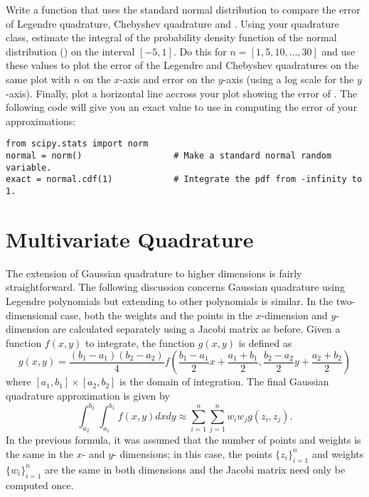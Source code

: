 \begin{problem} %
Write a function that uses the standard normal distribution to compare the error of Legendre quadrature, Chebyshev quadrature and .
Using your quadrature class, estimate the integral of the probability density function of the normal distribution () on the interval $[-5,1]$.
Do this for $n=[1,5,10,\dots,30]$ and use these values to plot the error of the Legendre and Chebyshev quadratures on the same plot with $n$ on the $x$-axis and error on the $y$-axis 
(using a log scale for the $y$-axis).
Finally, plot a horizontal line accross your plot showing the error of .
The following code will give you an exact value to use in computing the error of your approximations:

\begin{lstlisting}
from scipy.stats import norm
normal = norm()                  # Make a standard normal random variable.
exact = normal.cdf(1)            # Integrate the pdf from -infinity to 1.
\end{lstlisting}
\end{problem}


\section*{Multivariate Quadrature}

The extension of Gaussian quadrature to higher dimensions is fairly straightforward.
The following discussion concerns Gaussian quadrature using Legendre polynomials but extending to other polynomials is similar.
In the two-dimensional case, both the weights and the points in the $x$-dimension and $y$-dimension are calculated separately using a Jacobi matrix as before.
Given a function $f(x,y)$ to integrate, the function $g(x,y)$ is defined as
\[
g(x,y) = \frac{(b_1 - a_1) (b_2 - a_2)}{4} f\left( \frac{b_1 - a_1}{2} x + \frac{a_1 + b_1}{2}, \frac{b_2 - a_2}{2}y + \frac{a_2 + b_2}{2}\right)
\]
where $[a_1,b_1]\times [a_2,b_2]$ is the domain of integration.
The final Gaussian quadrature approximation is given by
\[
\int_{a_2}^{b_2} \int_{a_1}^{b_1} f(x,y) dx dy \approx \sum_{i=1}^n \sum_{j=1}^n w_i w_j g(z_i,z_j).
\]
In the previous formula, it was assumed that the number of points and weights is the same in the $x$- and $y$- dimensions; in this case, the points $\{z_i\}_{i=1}^n$ and weights $\{w_i\}_{i=1}^n$ 
are the same in both dimensions and the Jacobi matrix need only be computed once.

